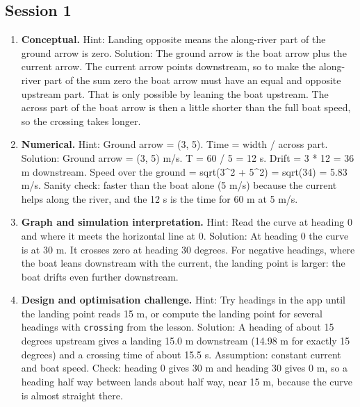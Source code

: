 \documentclass[11pt,a4paper]{article}
\begin{document}
\subsection*{Session 1}
\begin{enumerate}[nosep]
\item \textbf{Conceptual.} Hint: Landing opposite means the along-river part of the ground arrow is zero. Solution: The ground arrow is the boat arrow plus the current arrow. The current arrow points downstream, so to make the along-river part of the sum zero the boat arrow must have an equal and opposite upstream part. That is only possible by leaning the boat upstream. The across part of the boat arrow is then a little shorter than the full boat speed, so the crossing takes longer.
\item \textbf{Numerical.} Hint: Ground arrow = (3, 5). Time = width / across part. Solution: Ground arrow = (3, 5) m/s. T = 60 / 5 = 12 s. Drift = 3 * 12 = 36 m downstream. Speed over the ground = sqrt(3\textasciicircum{}2 + 5\textasciicircum{}2) = sqrt(34) = 5.83 m/s. Sanity check: faster than the boat alone (5 m/s) because the current helps along the river, and the 12 s is the time for 60 m at 5 m/s.
\item \textbf{Graph and simulation interpretation.} Hint: Read the curve at heading 0 and where it meets the horizontal line at 0. Solution: At heading 0 the curve is at 30 m. It crosses zero at heading 30 degrees. For negative headings, where the boat leans downstream with the current, the landing point is larger: the boat drifts even further downstream.
\item \textbf{Design and optimisation challenge.} Hint: Try headings in the app until the landing point reads 15 m, or compute the landing point for several headings with \texttt{crossing} from the lesson. Solution: A heading of about 15 degrees upstream gives a landing 15.0 m downstream (14.98 m for exactly 15 degrees) and a crossing time of about 15.5 s. Assumption: constant current and boat speed. Check: heading 0 gives 30 m and heading 30 gives 0 m, so a heading half way between lands about half way, near 15 m, because the curve is almost straight there.
\end{enumerate}
\end{document}

